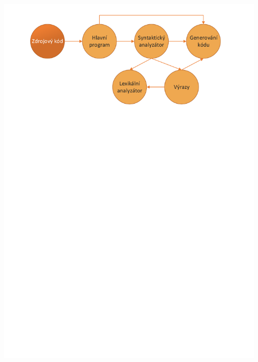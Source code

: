 \documentclass[11pt, hyperref={unicode}]{beamer}
\begin{document}
\begin{frame}
\begin{overprint}
 	\centerline{\includegraphics[width=0.95\linewidth]{img/zdrojovy_kod.pdf}}%

\end{overprint}
\end{frame}
\end{document}
